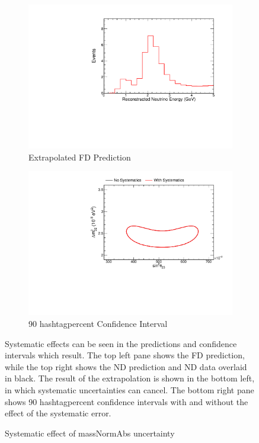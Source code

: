 {\begin{figure}
\begin{center}
\begin{subfigure}[c]{0.49\textwidth}
\includegraphics[width=\textwidth]{figures/systs/prediction/fd_extrap_prediction_massNormAbs.pdf}
\caption*{Extrapolated FD Prediction}
\end{subfigure}
\begin{subfigure}[c]{0.49\textwidth}
\includegraphics[width=\textwidth]{figures/systs/prediction/fd_extrap_contour_massNormAbs.pdf}
\caption*{90 hashtagpercent Confidence Interval}
\end{subfigure}
\end{center}
\caption{Systematic effect of massNormAbs uncertainty}{
Systematic effects can be seen in the predictions and confidence intervals
which result.
The top left pane shows the FD prediction, while the top right shows the
ND prediction and ND data overlaid in black.
The result of the extrapolation is shown in the bottom left, in which
systematic uncertainties can cancel.
The bottom right pane shows 90 hashtagpercent confidence intervals with and without
the effect of the systematic error.}
\label{syst_fig_massNormAbs}


\end{figure}}
